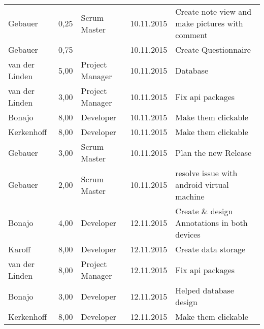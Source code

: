 \begin{longtable}{ l r p{2cm} c p{4cm} }
		Gebauer                 & 0,25           & Scrum Master          & 10.11.2015    & Create note view and make pictures with comment                                 \\
		Gebauer                 & 0,75           &                       & 10.11.2015    & Create Questionnaire                                                            \\
		van der Linden          & 5,00           & Project Manager       & 10.11.2015    & Database                                                                        \\
		van der Linden          & 3,00           & Project Manager       & 10.11.2015    & Fix api packages                                                                \\
		Bonajo                  & 8,00           & Developer             & 10.11.2015    & Make them clickable                                                             \\
		Kerkenhoff              & 8,00           & Developer             & 10.11.2015    & Make them clickable                                                             \\
		Gebauer                 & 3,00           & Scrum Master          & 10.11.2015    & Plan the new Release                                                            \\
		Gebauer                 & 2,00           & Scrum Master          & 10.11.2015    & resolve issue with android virtual machine                                            \\
		Bonajo                  & 4,00           & Developer             & 12.11.2015    & Create \& design Annotations in both devices                                    \\
		Karoff                  & 8,00           & Developer             & 12.11.2015    & Create data storage                                                             \\
		van der Linden          & 8,00           & Project Manager       & 12.11.2015    & Fix api packages                                                                \\
		Bonajo                  & 3,00           & Developer             & 12.11.2015    & Helped database design                                                          \\
		Kerkenhoff              & 8,00           & Developer             & 12.11.2015    & Make them clickable                                                             \\

\end{longtable}
